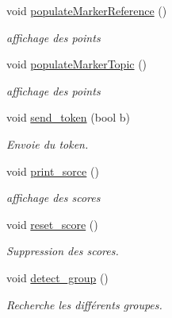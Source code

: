 \begin{DoxyCompactItemize}
void \hyperlink{classmoving__persons__detector_ab8a95eb655a08e7507bae53976739233}{populate\+Marker\+Reference} ()
\begin{DoxyCompactList}\small\item\em affichage des points \end{DoxyCompactList}\item 
void \hyperlink{classmoving__persons__detector_ac3ea794336284aefb88e9b78a3ce8f8f}{populate\+Marker\+Topic} ()
\begin{DoxyCompactList}\small\item\em affichage des points \end{DoxyCompactList}\item 
void \hyperlink{classmoving__persons__detector_aa198d0acd452104d0292c613af3ca520}{send\+\_\+token} (bool b)
\begin{DoxyCompactList}\small\item\em Envoie du token. \end{DoxyCompactList}\item 
void \hyperlink{classmoving__persons__detector_a73acba9d4ee78f4cfb1bf0659334cd49}{print\+\_\+sorce} ()
\begin{DoxyCompactList}\small\item\em affichage des scores \end{DoxyCompactList}\item 
void \hyperlink{classmoving__persons__detector_aa2f36db42b79877062d4d9326995eb4d}{reset\+\_\+score} ()
\begin{DoxyCompactList}\small\item\em Suppression des scores. \end{DoxyCompactList}\item 
void \hyperlink{classmoving__persons__detector_a963302ef27df7f685e48ab4d0c5cb674}{detect\+\_\+group} ()
\begin{DoxyCompactList}\small\item\em Recherche les différents groupes. \end{DoxyCompactList}\end{DoxyCompactItemize}
